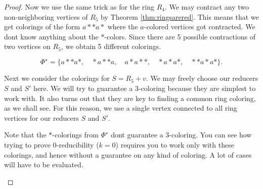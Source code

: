 \begin{proof}
Now we use the same trick as for the ring $R_4$. We may contract any two non-neighboring vertices of $R_5$ by Theorem \ref{thm:ringsarered}. This means that we get colorings of the form $a{*}{*}a{*}$ where the $a$-colored vertices got contracted. We dont know anything about the ${*}$-colors. Since there are 5 possible contractions of two vertices on $R_5$, we obtain 5 different colorings.

\begin{equation}
    \Phi^\star = \{ a{*}{*}a{*}, \quad {*}a{*}{*}a, \quad a{*}a{*}{*}, \quad {*}a{*}a{*}, \quad {*}{*}a{*}a{*} \}.
\end{equation}

Next we consider the colorings for $S=R_5+v$. We may freely choose our reducers $S$ and $S'$ here. We will try to guarantee a 3-coloring because they are simplest to work with. It also turns out that they are key to finding a common ring coloring, as we shall see. For this reason, we use a single vertex connected to all ring vertices for our reducers $S$ and $S'$. 

Note that the ${*}$-colorings from $\Phi^\star$ dont guarantee a 3-coloring. You can see how trying to prove 0-reducibility ($k=0$) requires you to work only with these colorings, and hence without a guarantee on any kind of coloring. A lot of cases will have to be evaluated.

\needspace{5cm}
\begin{figure}[!ht]
    \centering
\end{figure}
\end{proof}

